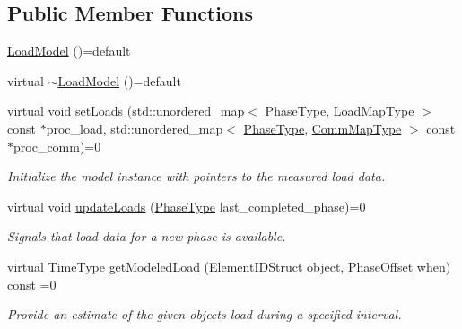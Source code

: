 \subsection*{Public Member Functions}
\begin{DoxyCompactItemize}
\item 
\hyperlink{structvt_1_1vrt_1_1collection_1_1balance_1_1_load_model_a90f345e752441d66b2893027f2626226}{Load\+Model} ()=default
\item 
virtual \hyperlink{structvt_1_1vrt_1_1collection_1_1balance_1_1_load_model_a6478a387f285b322a48ee1d8a80fc6f7}{$\sim$\+Load\+Model} ()=default
\item 
virtual void \hyperlink{structvt_1_1vrt_1_1collection_1_1balance_1_1_load_model_a07512b8d95025a21a7c25cc3fdb817ad}{set\+Loads} (std\+::unordered\+\_\+map$<$ \hyperlink{namespacevt_a46ce6733d5cdbd735d561b7b4029f6d7}{Phase\+Type}, \hyperlink{namespacevt_1_1vrt_1_1collection_1_1balance_a5339303db2e1ce964d783a53fd74e6b1}{Load\+Map\+Type} $>$ const $\ast$proc\+\_\+load, std\+::unordered\+\_\+map$<$ \hyperlink{namespacevt_a46ce6733d5cdbd735d561b7b4029f6d7}{Phase\+Type}, \hyperlink{namespacevt_1_1vrt_1_1collection_1_1balance_a01ee1fb0ae2da1d2ab7fdca3be9ae351}{Comm\+Map\+Type} $>$ const $\ast$proc\+\_\+comm)=0
\begin{DoxyCompactList}\small\item\em Initialize the model instance with pointers to the measured load data. \end{DoxyCompactList}\item 
virtual void \hyperlink{structvt_1_1vrt_1_1collection_1_1balance_1_1_load_model_a4f1c6fb5d7d7a0b147755f025b1d5f5c}{update\+Loads} (\hyperlink{namespacevt_a46ce6733d5cdbd735d561b7b4029f6d7}{Phase\+Type} last\+\_\+completed\+\_\+phase)=0
\begin{DoxyCompactList}\small\item\em Signals that load data for a new phase is available. \end{DoxyCompactList}\item 
virtual \hyperlink{namespacevt_a876a9d0cd5a952859c72de8a46881442}{Time\+Type} \hyperlink{structvt_1_1vrt_1_1collection_1_1balance_1_1_load_model_ac1e4cfe4bdacad8df0be7e1803390927}{get\+Modeled\+Load} (\hyperlink{namespacevt_1_1vrt_1_1collection_1_1balance_a9f5b53fafb270212279a4757d2c4cd28}{Element\+I\+D\+Struct} object, \hyperlink{structvt_1_1vrt_1_1collection_1_1balance_1_1_phase_offset}{Phase\+Offset} when) const =0
\begin{DoxyCompactList}\small\item\em Provide an estimate of the given object\textquotesingle{}s load during a specified interval. \end{DoxyCompactList}\item 

\end{DoxyCompactItemize}
